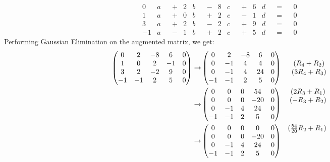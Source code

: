 \documentclass[12pt]{article}
\newenvironment{problem}[2][Problem]
{
	\begin{trivlist} 
		\item[\hskip \labelsep {\bfseries #1 #2:}]
	}
{
	\end{trivlist}
	}
\newenvironment{solution}[1][Solution]
{
	\begin{trivlist} 
		\item[\hskip \labelsep {\itshape #1:}]
	}
	{
	\end{trivlist}
}
\begin{document}
\begin{problem}{2}
\begin{solution}
\begin{align*}
&&&&&&&& &&&&&&&& &&&&&&&& 0&a& &+& 2&b& &-& 8&c& &+& 6&d& &=& &0& &&&&&&&& &&&&&&&& &&&&&&&&\\
&&&&&&&& &&&&&&&& &&&&&&&& 1&a& &+& 0&b& &+& 2&c& &-& 1&d& &=& &0& &&&&&&&& &&&&&&&& &&&&&&&&\\
&&&&&&&& &&&&&&&& &&&&&&&& 3&a& &+& 2&b& &-& 2&c& &+& 9&d& &=& &0& &&&&&&&& &&&&&&&& &&&&&&&&\\
&&&&&&&& &&&&&&&& &&&&&&&& -1&a& &-& 1&b& &+& 2&c& &+& 5&d& &=& &0& &&&&&&&& &&&&&&&& &&&&&&&&
\end{align*}
Performing Gaussian Elimination on the augmented matrix, we get:
%
\begin{align*}
%
\begin{pmatrix} 0&2&-8&6&0 \\ 1&0&2&-1&0 \\ 3&2&-2&9&0 \\ -1&-1&2&5&0  \end{pmatrix} \rightarrow & \begin{pmatrix} 0&2&-8&6&0 \\ 0&-1&4&4&0 \\ 0&-1&4&24&0 \\ -1&-1&2&5&0 \end{pmatrix} & \begin{matrix} \hphantom{1}\\(R_4+R_2) \hphantom{1}\\ (3R_4+R_3)\hphantom{1}\\ \hphantom{1}\end{matrix} \\
%
\rightarrow & \begin{pmatrix} 0&0&0&54&0 \\ 0&0&0&-20&0 \\ 0&-1&4&24&0 \\ -1&-1&2&5&0 \end{pmatrix} & \begin{matrix} (2R_3+R_1)\hphantom{1}\\ (-R_3+R_2)\hphantom{1}\\ \hphantom{1}\\ \hphantom{1}\end{matrix} \\%
%
\rightarrow & \begin{pmatrix} 0&0&0&0&0 \\ 0&0&0&-20&0 \\ 0&-1&4&24&0 \\ -1&-1&2&5&0 \end{pmatrix} & \begin{matrix} (\frac{54}{20}R_2+R_1)\hphantom{1}\\ \hphantom{1}\\ \hphantom{1}\\ \hphantom{1}\end{matrix} \\

\end{align*}
\end{solution}
\end{problem}
\end{document}
